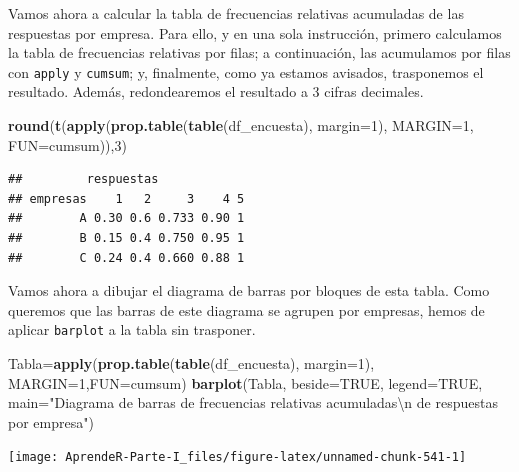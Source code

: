 \documentclass[]{book}
\newenvironment{Shaded}{\begin{snugshade}}{\end{snugshade}}
\newcommand{\CharTok}[1]{\textcolor[rgb]{0.31,0.60,0.02}{#1}}
\newcommand{\DataTypeTok}[1]{\textcolor[rgb]{0.13,0.29,0.53}{#1}}
\newcommand{\DecValTok}[1]{\textcolor[rgb]{0.00,0.00,0.81}{#1}}
\newcommand{\KeywordTok}[1]{\textcolor[rgb]{0.13,0.29,0.53}{\textbf{#1}}}
\newcommand{\NormalTok}[1]{#1}
\newcommand{\OtherTok}[1]{\textcolor[rgb]{0.56,0.35,0.01}{#1}}
\newcommand{\StringTok}[1]{\textcolor[rgb]{0.31,0.60,0.02}{#1}}
\theoremstyle{definition}
\theoremstyle{definition}
\theoremstyle{definition}
\theoremstyle{remark}
\begin{document}
Vamos ahora a calcular la tabla de frecuencias relativas acumuladas de las respuestas por empresa. Para ello, y en una sola instrucción, primero calculamos la tabla de frecuencias relativas por filas; a continuación, las acumulamos por filas con \texttt{apply} y \texttt{cumsum}; y, finalmente, como ya estamos avisados, trasponemos el resultado. Además, redondearemos el resultado a 3 cifras decimales.

\begin{Shaded}
\begin{Highlighting}[]
\KeywordTok{round}\NormalTok{(}\KeywordTok{t}\NormalTok{(}\KeywordTok{apply}\NormalTok{(}\KeywordTok{prop.table}\NormalTok{(}\KeywordTok{table}\NormalTok{(df_encuesta), }\DataTypeTok{margin=}\DecValTok{1}\NormalTok{), }\DataTypeTok{MARGIN=}\DecValTok{1}\NormalTok{, }\DataTypeTok{FUN=}\NormalTok{cumsum)),}\DecValTok{3}\NormalTok{)}
\end{Highlighting}
\end{Shaded}

\begin{verbatim}
##         respuestas
## empresas    1   2     3    4 5
##        A 0.30 0.6 0.733 0.90 1
##        B 0.15 0.4 0.750 0.95 1
##        C 0.24 0.4 0.660 0.88 1
\end{verbatim}

Vamos ahora a dibujar el diagrama de barras por bloques de esta tabla. Como queremos que las barras de este diagrama se agrupen por empresas, hemos de aplicar \texttt{barplot} a la tabla sin trasponer.

\begin{Shaded}
\begin{Highlighting}[]
\NormalTok{Tabla=}\KeywordTok{apply}\NormalTok{(}\KeywordTok{prop.table}\NormalTok{(}\KeywordTok{table}\NormalTok{(df_encuesta), }\DataTypeTok{margin=}\DecValTok{1}\NormalTok{), }\DataTypeTok{MARGIN=}\DecValTok{1}\NormalTok{,}\DataTypeTok{FUN=}\NormalTok{cumsum)}
\KeywordTok{barplot}\NormalTok{(Tabla, }\DataTypeTok{beside=}\OtherTok{TRUE}\NormalTok{, }\DataTypeTok{legend=}\OtherTok{TRUE}\NormalTok{,}
        \DataTypeTok{main=}\StringTok{"Diagrama de barras de frecuencias relativas acumuladas}\CharTok{\textbackslash{}n}\StringTok{ de respuestas por empresa"}\NormalTok{)}
\end{Highlighting}
\end{Shaded}

\begin{center}\texttt{[image: AprendeR-Parte-I\_files/figure-latex/unnamed-chunk-541-1]} \end{center}
\end{document}
